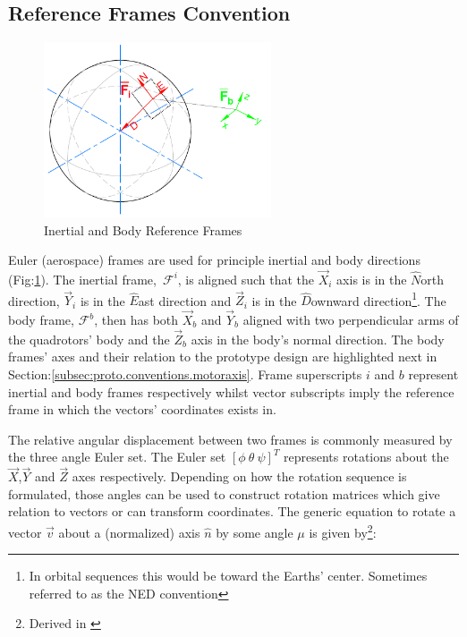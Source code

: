 \subsection{Reference Frames Convention}
\label{subsec:proto.conventions.frames}
\begin{figure}[htbp]
\centering
\includegraphics[width=0.6\textwidth]{figs/reference_frame}
\caption{Inertial and Body Reference Frames}
\label{fig:ref_frame}
\end{figure}
Euler (aerospace) frames are used for principle inertial and body directions (Fig:\ref{fig:ref_frame}). The inertial frame,~$\mathcal{F}^i$, is aligned such that the $\vec{X}_i$ axis is in the $\hat{N}$orth direction, $\vec{Y}_i$ is in the $\hat{E}$ast direction and $\vec{Z}_i$ is  in the $\hat{D}$ownward direction\footnote{In orbital sequences this would be toward the Earths' center. Sometimes referred to as the NED convention}. The body frame, $\mathcal{F}^b$, then has both $\vec{X}_b$ and $\vec{Y}_b$ aligned with two perpendicular arms of the quadrotors' body and the $\vec{Z}_b$ axis in the body's normal direction. The body frames' axes and their relation to the prototype design are highlighted next in Section:\ref{subsec:proto.conventions.motoraxis}. Frame superscripts $i$ and $b$ represent inertial and body frames respectively whilst vector subscripts imply the reference frame in which the vectors' coordinates exists in.
\par
The relative angular displacement between two frames is commonly measured by the three angle Euler set. The Euler set $[\phi ~\theta ~\psi]^T$ represents rotations about the $\vec{X}$,$\vec{Y}$ and $\vec{Z}$ axes respectively. Depending on how the rotation sequence is formulated, those angles can be used to construct rotation matrices which give relation to vectors or can transform coordinates. The generic equation to rotate a vector $\vec{v}$ about a (normalized) axis $\hat{n}$ by some angle $\mu$ is given by\footnote{Derived in \cite{quaddynamics}}:
